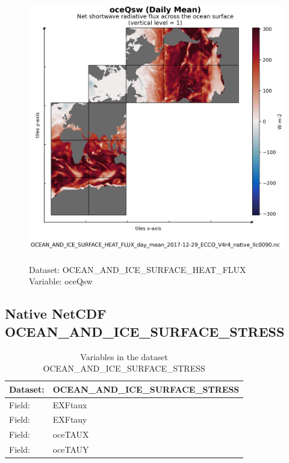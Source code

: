 \begin{figure}[H]
\centering
\includegraphics[scale=0.5]{../images/plots/native_plots/Ocean_and_Sea-Ice_Surface_Heat_Fluxes/oceQsw.png}
\caption{\\Dataset: OCEAN\_AND\_ICE\_SURFACE\_HEAT\_FLUX\\Variable: oceQsw}
\label{tab:table-OCEAN_AND_ICE_SURFACE_HEAT_FLUX_oceQsw-Plot}
\end{figure}
\pagebreak
\subsection{Native NetCDF OCEAN\_AND\_ICE\_SURFACE\_STRESS}
\newp
\begin{longtable}{|p{}|p{}|}
\caption{Variables in the dataset OCEAN\_AND\_ICE\_SURFACE\_STRESS}
\label{tab:table-OCEAN_AND_ICE_SURFACE_STRESS-fields} \\ 
\hline \endhead \hline \endfoot
\rowcolor{lightgray} \textbf{Dataset:} & \textbf{OCEAN\_AND\_ICE\_SURFACE\_STRESS} \\ \hline
Field: &EXFtaux \\ \hline
Field: &EXFtauy \\ \hline
Field: &oceTAUX \\ \hline
Field: &oceTAUY \\ \hline
\end{longtable}

